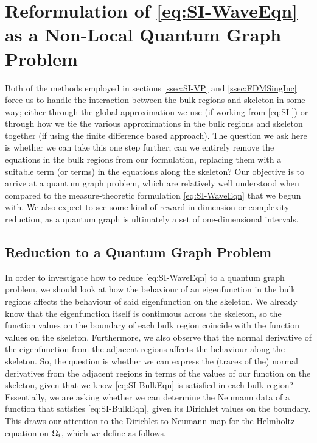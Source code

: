 \section{Reformulation of \eqref{eq:SI-WaveEqn} as a Non-Local Quantum Graph Problem} \label{sec:SI-NonLocalQG}
Both of the methods employed in sections \ref{ssec:SI-VP} and \ref{ssec:FDMSingInc} force us to handle the interaction between the bulk regions and skeleton in some way; either through the global approximation we use (if working from \eqref{eq:SI-}) or through how we tie the various approximations in the bulk regions and skeleton together (if using the finite difference based approach).
The question we ask here is whether we can take this one step further; can we entirely remove the equations in the bulk regions from our formulation, replacing them with a suitable term (or terms) in the equations along the skeleton?
Our objective is to arrive at a quantum graph problem, which are relatively well understood when compared to the measure-theoretic formulation \eqref{eq:SI-WaveEqn} that we begun with.
We also expect to see some kind of reward in dimension or complexity reduction, as a quantum graph is ultimately a set of one-dimensional intervals.

\subsection{Reduction to a Quantum Graph Problem} \label{ssec:SI-ToQG}
In order to investigate how to reduce \eqref{eq:SI-WaveEqn} to a quantum graph problem, we should look at how the behaviour of an eigenfunction in the bulk regions affects the behaviour of said eigenfunction on the skeleton.
We already know that the eigenfunction itself is continuous across the skeleton, so the function values on the boundary of each bulk region coincide with the function values on the skeleton.
Furthermore, we also observe that the normal derivative of the eigenfunction from the adjacent regions affects the behaviour along the skeleton.
So, the question is whether we can express the (traces of the) normal derivatives from the adjacent regions in terms of the values of our function on the skeleton, given that we know \eqref{eq:SI-BulkEqn} is satisfied in each bulk region?
Essentially, we are asking whether we can determine the Neumann data of a function that satisfies \eqref{eq:SI-BulkEqn}, given its Dirichlet values on the boundary.
This draws our attention to the Dirichlet-to-Neumann map for the Helmholtz equation on $\Omega_i$, which we define as follows.

